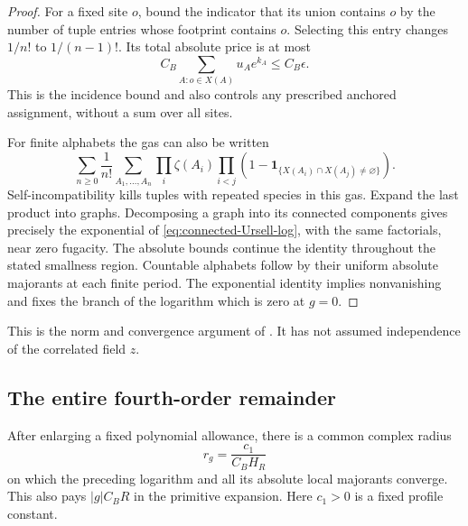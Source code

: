 \documentclass[11pt,reqno]{amsart}
\numberwithin{equation}{section}
\theoremstyle{definition}
\theoremstyle{remark}
\begin{document}
\begin{proof}
For a fixed site \(o\), bound the
indicator that its union contains \(o\)
by the number of tuple entries whose
footprint contains \(o\).
Selecting this entry changes \(1/n!\)
to \(1/(n-1)!\).
Its total absolute price is at most
\[
                 C_B\sum_{A:o\in X(A)}u_Ae^{k_A}
                                  \le C_B\epsilon .
\]
This is the incidence bound and also
controls any prescribed anchored
assignment, without a sum over all sites.

For finite alphabets the gas can also
be written
\[
 \sum_{n\ge0}\frac1{n!}\sum_{A_1,\ldots,A_n}
        \prod_i\zeta(A_i)
        \prod_{i<j}
          (1-\mathbf1_{\{X(A_i)\cap X(A_j)\ne\varnothing\}}).
\]
Self-incompatibility kills tuples
with repeated species in this gas.
Expand the last product into graphs.
Decomposing a graph into its connected
components gives precisely the
exponential of
\eqref{eq:connected-Ursell-log},
with the same factorials, near zero
fugacity.
The absolute bounds continue the
identity throughout the stated
smallness region. Countable alphabets
follow by their uniform absolute
majorants at each finite period.
The exponential identity implies
nonvanishing and fixes the branch of
the logarithm which is zero at \(g=0\).
\end{proof}

This is the norm and convergence
argument of \cite[Lemma~24.2,
pp.~122--123]{Main}.
It has not assumed independence of
the correlated field \(z\).

\subsection{The entire fourth-order remainder}

After enlarging a fixed polynomial
allowance, there is a common complex
radius
\[
                         r_g=\frac{c_1}{C_BH_R}
\]
on which the preceding logarithm and
all its absolute local majorants
converge. This also pays
\(|g|C_BR\) in the primitive expansion.
Here \(c_1>0\) is a fixed profile constant.
\end{document}
